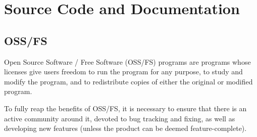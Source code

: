 
\section{Source Code and Documentation}

\subsection{OSS/FS}

Open Source Software / Free Software (OSS/FS) programs are programs whose
licenses give users freedom to run the program for any purpose, to study and
modify the program, and to redistribute copies of either the original or
modified program\cite{why-oss-fs}.

To fully reap the benefits of OSS/FS, it is necessary to ensure that there is
an active community around it, devoted to bug tracking and fixing, as well as
developing new features (unless the product can be deemed feature-complete).



